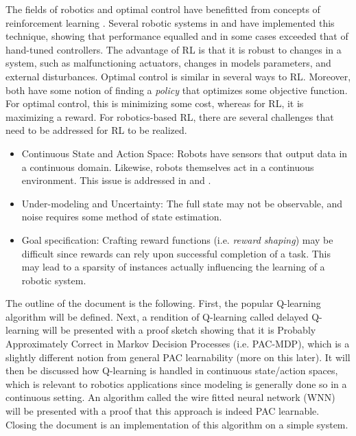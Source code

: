 \documentclass{article} %
\begin{document}
The fields of robotics and optimal control have benefitted from concepts of reinforcement learning \cite{kober_reinforcement_2013}\cite{kaelbling_reinforcement_1996}. Several robotic systems in  \cite{bhasin_reinforcement_2011} and \cite{hester_rtmba:_2012} have implemented this technique, showing that performance equalled and in some cases exceeded that of hand-tuned controllers. The advantage of RL is that it is robust to changes in a system, such as malfunctioning actuators, changes in models parameters, and external disturbances. Optimal control is similar in several ways to RL. Moreover, both have some notion of finding a \textit{policy} that optimizes some objective function. For optimal control, this is minimizing some cost, whereas for RL, it is maximizing a reward. For robotics-based RL, there are several challenges that need to be addressed for RL to be realized.
\begin{itemize}
\item Continuous State and Action Space: Robots have sensors that output data in a continuous domain.  Likewise, robots themselves act in a continuous environment. This issue is addressed in \cite{gaskett_thesis} and \cite{q_learning_navigation}.
\item Under-modeling and Uncertainty: The full state may not be observable, and noise requires some method of state estimation.
\item Goal specification: Crafting reward functions (i.e. \textit{reward shaping}) may be difficult since rewards can rely upon successful completion of a task. This may lead to a sparsity of instances actually influencing the learning of a robotic system.
\end{itemize}
The outline of the document is the following. First, the popular Q-learning algorithm will be  defined. Next, a rendition of Q-learning called delayed Q-learning will be presented with a proof sketch showing that it is Probably Approximately Correct in Markov Decision Processes (i.e. PAC-MDP), which is a slightly different notion from general PAC learnability (more on this later). It will then be discussed how Q-learning is handled in continuous state/action spaces, which is relevant to robotics applications since modeling is generally done so in a continuous setting. An algorithm called the wire fitted neural network (WNN) will be presented with a proof that this approach is indeed PAC learnable. Closing the document is an implementation of this algorithm on a simple system.
\end{document}
